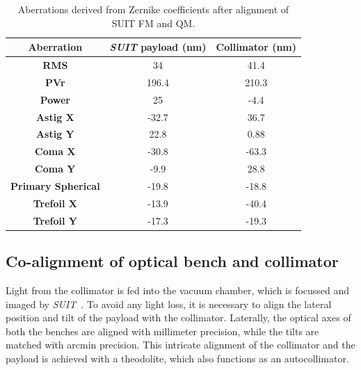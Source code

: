 \documentclass[12pt]{spieman}  %
\newcommand{\suit}{{\it SUIT~}}
\begin{document}
\begin{table}[ht]
\caption{Aberrations derived from Zernike coefficients after alignment of SUIT FM and QM.}
\label{table: zernikes}
    \begin{center}
			\begin{tabular}{|c|c|c|}
				\hline
				\rule[-1ex]{0pt}{2.5ex} \textbf{Aberration} & \textbf{\textit{SUIT} payload (nm)} & \textbf{Collimator (nm)}\\
				\hline
				\hline
				\rule[-1ex]{0pt}{2.5ex} \textbf{RMS} & 34 & 41.4 \\
				\hline
				\rule[-1ex]{0pt}{2.5ex} \textbf{PVr} & 196.4 & 210.3 \\
				\hline
				\rule[-1ex]{0pt}{2.5ex} \textbf{Power} & 25 & -4.4 \\
				\hline
				\rule[-1ex]{0pt}{2.5ex} \textbf{Astig X} & -32.7 & 36.7 \\
				\hline
				\rule[-1ex]{0pt}{2.5ex} \textbf{Astig Y} & 22.8 & 0.88 \\
				\hline
				\rule[-1ex]{0pt}{2.5ex} \textbf{Coma X} & -30.8 & -63.3 \\
				\hline
				\rule[-1ex]{0pt}{2.5ex} \textbf{Coma Y} & -9.9 & 28.8 \\
				\hline
				\rule[-1ex]{0pt}{2.5ex} \textbf{Primary Spherical} & -19.8 & -18.8 \\
				\hline
				\rule[-1ex]{0pt}{2.5ex} \textbf{Trefoil X} & -13.9 & -40.4 \\
				\hline
				\rule[-1ex]{0pt}{2.5ex} \textbf{Trefoil Y }& -17.3 & -19.3 \\
				\hline
			\end{tabular}
		\end{center}
	\end{table} 
	
\subsection{Co-alignment of optical bench and collimator}
Light from the collimator is fed into the vacuum chamber, which is focussed and imaged by \suit. To avoid any light loss, it is necessary to align the lateral position and tilt of the payload with the collimator. Laterally, the optical axes of both the benches are aligned with millimeter precision, while the tilts are matched with arcmin precision. This intricate alignment of the collimator and the payload is achieved with a theodolite, which also functions as an autocollimator.
\end{document}
